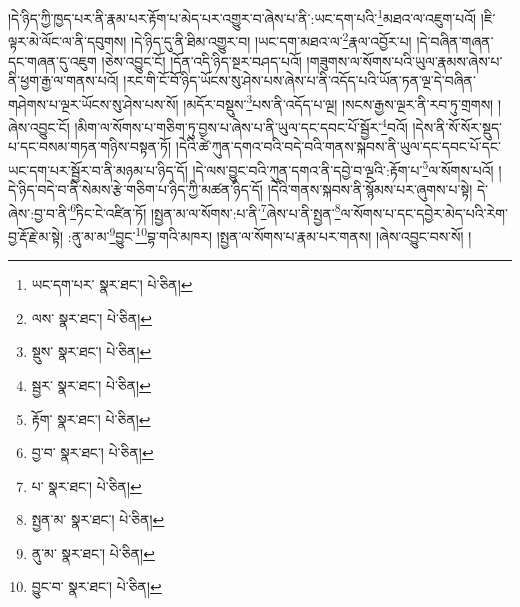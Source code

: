 །དེ་ཉིད་ཀྱི་ཁྱད་པར་ནི་རྣམ་པར་རྟོག་པ་མེད་པར་འགྱུར་བ་ཞེས་པ་ནི་:ཡང་དག་པའི་\footnote{ཡང་དག་པར་  སྣར་ཐང་།  པེ་ཅིན། }མཐའ་ལ་འཇུག་པའོ། །ཇི་ལྟར་མེ་ལོང་ལ་ནི་དབུགས། །དེ་ཉིད་དུ་ནི་ཐིམ་འགྱུར་བ། །ཡང་དག་མཐའ་ལ་\footnote{ལས་  སྣར་ཐང་།  པེ་ཅིན། }རྣལ་འབྱོར་པ། །དེ་བཞིན་གཞན་དང་གཞན་དུ་འཇུག །ཅེས་འབྱུང་ངོ། །དོན་འདི་ཉིད་སྔར་བཤད་པའོ། །གཟུགས་ལ་སོགས་པའི་ཡུལ་རྣམས་ཞེས་པ་ནི་ཕྱག་རྒྱ་ལ་གནས་པའོ། །རང་གི་ངོ་བོ་ཉིད་ཡོངས་སུ་ཤེས་པས་ཞེས་པ་ནི་འདོད་པའི་ཡོན་ཏན་ལྔ་དེ་བཞིན་གཤེགས་པ་ལྔར་ཡོངས་སུ་ཤེས་པས་སོ། །མདོར་བསྡུས་\footnote{སྡུས་  སྣར་ཐང་།  པེ་ཅིན། }པས་ནི་འདོད་པ་ལྔ། །སངས་རྒྱས་ལྔར་ནི་རབ་ཏུ་གྲགས། །ཞེས་འབྱུང་ངོ། །མིག་ལ་སོགས་པ་གཅིག་ཏུ་བྱས་པ་ཞེས་པ་ནི་ཡུལ་དང་དབང་པོ་སྦྱོར་\footnote{སྦྱར་  སྣར་ཐང་།  པེ་ཅིན། }བའོ། །དེས་ནི་སོ་སོར་སྡུད་པ་དང་བསམ་གཏན་གཉིས་བསྟན་ཏོ། །དེའི་ཚེ་ཀུན་དགའ་བའི་བདེ་བའི་གནས་སྐབས་ནི་ཡུལ་དང་དབང་པོ་དང་ཡང་དག་པར་སྦྱོར་བ་ནི་མཉམ་པ་ཉིད་དོ། །དེ་ལས་བྱུང་བའི་ཀུན་དགའ་ནི་དབྱེ་བ་ལྔའི་:རྟོག་པ་\footnote{རྟོག་  སྣར་ཐང་།  པེ་ཅིན། }ལ་སོགས་པའོ། །དེ་ཉིད་བདེ་བ་ནི་སེམས་རྩེ་གཅིག་པ་ཉིད་ཀྱི་མཚན་ཉིད་དོ། །དེའི་གནས་སྐབས་ནི་སྙོམས་པར་ཞུགས་པ་སྟེ། དེ་ཞེས་:བྱ་བ་ནི་\footnote{བྱ་བ་  སྣར་ཐང་།  པེ་ཅིན། }ཏིང་ངེ་འཛིན་ཏོ། །སྤྱན་མ་ལ་སོགས་:པ་ནི་\footnote{པ་  སྣར་ཐང་།  པེ་ཅིན། }ཞེས་པ་ནི་སྤྱན་\footnote{སྤྱན་མ་  སྣར་ཐང་།  པེ་ཅིན། }ལ་སོགས་པ་དང་དབྱེར་མེད་པའི་རེག་བྱ་རྡོ་རྗེ་མ་སྟེ། :ནུ་མ་མ་\footnote{ནུ་མ་  སྣར་ཐང་།  པེ་ཅིན། }བྱུང་\footnote{བྱུང་བ་  སྣར་ཐང་།  པེ་ཅིན། }བྷ་གའི་མཁར། །སྤྱན་ལ་སོགས་པ་རྣམ་པར་གནས། །ཞེས་འབྱུང་བས་སོ། །
